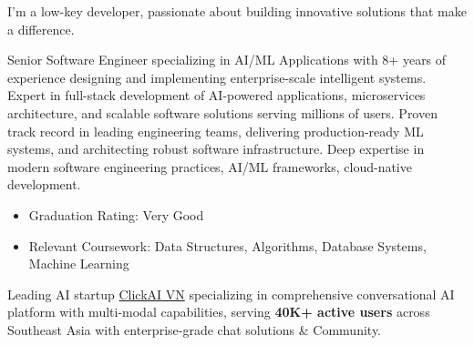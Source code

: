 \documentclass[10pt,a4paper,ragged2e,withhyper]{altacv}
\begin{document}


\makecvheader

\begin{minipage}{\linewidth}
\justifying
I'm a low-key developer, passionate about building innovative solutions that make a difference.

Senior Software Engineer specializing in AI/ML Applications with 8+ years of experience designing and implementing enterprise-scale intelligent systems. Expert in full-stack development of AI-powered applications, microservices architecture, and scalable software solutions serving millions of users. Proven track record in leading engineering teams, delivering production-ready ML systems, and architecting robust software infrastructure. Deep expertise in modern software engineering practices, AI/ML frameworks, cloud-native development.
\end{minipage}

\begin{itemize}
	\item Graduation Rating: Very Good
	\item Relevant Coursework: Data Structures, Algorithms, Database Systems, Machine Learning
\end{itemize}



\begin{minipage}{\linewidth}
\justifying
Leading AI startup \href{http://clickai.vn}{ClickAI VN} specializing in comprehensive conversational AI platform with multi-modal capabilities, serving \textbf{40K+ active users} across Southeast Asia with enterprise-grade chat solutions & Community.
\end{minipage}

\medskip
\end{document}
